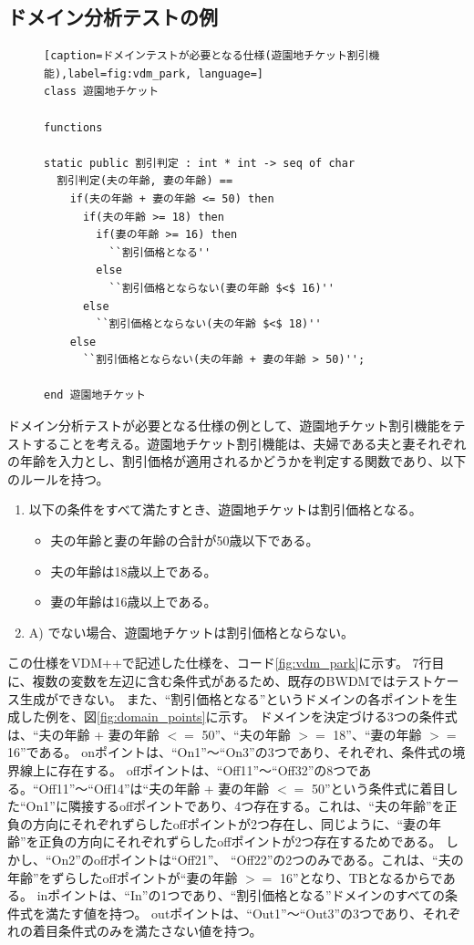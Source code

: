 \documentclass[uplatex, report, a4j, 10pt]{jsbook}
\begin{document}
\subsection{ドメイン分析テストの例}
\begin{figure}[tp]
\begin{lstlisting}[caption=ドメインテストが必要となる仕様(遊園地チケット割引機能),label=fig:vdm_park, language=]
class 遊園地チケット

functions

static public 割引判定 : int * int -> seq of char
  割引判定(夫の年齢, 妻の年齢) ==
    if(夫の年齢 + 妻の年齢 <= 50) then
      if(夫の年齢 >= 18) then
        if(妻の年齢 >= 16) then
          ``割引価格となる''
        else
          ``割引価格とならない(妻の年齢 $<$ 16)''
      else
        ``割引価格とならない(夫の年齢 $<$ 18)''
    else
      ``割引価格とならない(夫の年齢 + 妻の年齢 > 50)'';

end 遊園地チケット
\end{lstlisting}
\end{figure}

ドメイン分析テストが必要となる仕様の例として、遊園地チケット割引機能をテストすることを考える。遊園地チケット割引機能は、夫婦である夫と妻それぞれの年齢を入力とし、割引価格が適用されるかどうかを判定する関数であり、以下のルールを持つ。
\begin{enumerate}
  \renewcommand{\labelenumi}{\Alph{enumi})}
  \item\label{enu:yuenchi} 以下の条件をすべて満たすとき、遊園地チケットは割引価格となる。
        \begin{itemize}
          \item 夫の年齢と妻の年齢の合計が50歳以下である。
          \item 夫の年齢は18歳以上である。
          \item 妻の年齢は16歳以上である。
        \end{itemize}
  \item A) でない場合、遊園地チケットは割引価格とならない。
\end{enumerate}
この仕様をVDM++で記述した仕様を、コード\ref{fig:vdm_park}に示す。
7行目に、複数の変数を左辺に含む条件式があるため、既存のBWDMではテストケース生成ができない。
また、“割引価格となる”というドメインの各ポイントを生成した例を、図\ref{fig:domain_points}に示す。
ドメインを決定づける3つの条件式は、“夫の年齢 + 妻の年齢 $<=$ 50”、“夫の年齢 $>=$ 18”、“妻の年齢 $>=$ 16”である。
onポイントは、“On1”〜“On3”の3つであり、それぞれ、条件式の境界線上に存在する。
offポイントは、“Off11”〜“Off32”の8つである。“Off11”〜“Off14”は“夫の年齢 + 妻の年齢 $<=$ 50”という条件式に着目した“On1”に隣接するoffポイントであり、4つ存在する。これは、“夫の年齢”を正負の方向にそれぞれずらしたoffポイントが2つ存在し、同じように、“妻の年齢”を正負の方向にそれぞれずらしたoffポイントが2つ存在するためである。
しかし、“On2”のoffポイントは“Off21”、 “Off22”の2つのみである。これは、“夫の年齢”をずらしたoffポイントが“妻の年齢 $>=$ 16”となり、TBとなるからである。
inポイントは、“In”の1つであり、“割引価格となる”ドメインのすべての条件式を満たす値を持つ。
outポイントは、“Out1”〜“Out3”の3つであり、それぞれの着目条件式のみを満たさない値を持つ。
\end{document}
